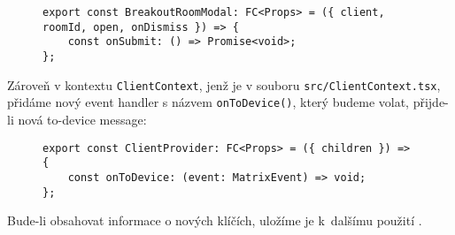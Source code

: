 \begin{figure}[H]
    \begin{verbatim}
export const BreakoutRoomModal: FC<Props> = ({ client, roomId, open, onDismiss }) => {
	const onSubmit: () => Promise<void>;
};
	\end{verbatim}
\end{figure}

Zároveň v kontextu \texttt{ClientContext}, jenž je v souboru
\texttt{src/ClientContext.tsx}, přidáme nový event handler s názvem
\texttt{onToDevice()}, který budeme volat, přijde-li nová
to-device message:

\begin{figure}[H]
    \begin{verbatim}
export const ClientProvider: FC<Props> = ({ children }) => {
	const onToDevice: (event: MatrixEvent) => void;
};
	\end{verbatim}
\end{figure}

Bude-li obsahovat informace o nových klíčích, uložíme je
k~dalšímu použití \parencite{GitHub-ElementCall-BreakoutRooms}.
